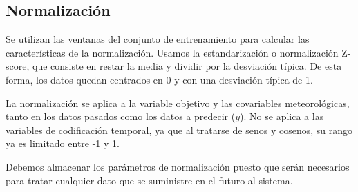 \subsection{Normalización}
Se utilizan las ventanas del conjunto de entrenamiento para calcular las características de la normalización.
Usamos la estandarización o normalización Z-score, que consiste en restar la media y dividir por la desviación típica.
De esta forma, los datos quedan centrados en 0 y con una desviación típica de 1.

La normalización se aplica a la variable objetivo y las covariables meteorológicas, tanto en los datos pasados como los datos a predecir ($y$). 
No se aplica a las variables de codificación temporal, ya que al tratarse de senos y cosenos, su rango ya es limitado entre -1 y 1.

Debemos almacenar los parámetros de normalización puesto que serán necesarios para tratar cualquier dato que se suministre en el futuro al sistema.
